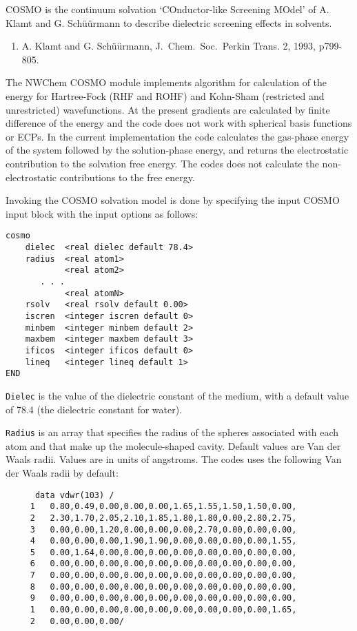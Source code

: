 \label{sec:cosmo}

COSMO is the continuum solvation `COnductor-like Screening MOdel'
of A. Klamt and G. Sch\"{u}\"{u}rmann to describe dielectric screening
effects in solvents.

\begin{enumerate}
\item A. Klamt and G. Sch\"{u}\"{u}rmann, J.~Chem.~Soc.~Perkin Trans. 2, 1993,
p799-805.
\end{enumerate}

The NWChem COSMO module implements algorithm for calculation of the
energy for Hartree-Fock (RHF and ROHF) and Kohn-Sham (restricted and unrestricted)
wavefunctions. At the present gradients are calculated by finite
difference of the energy and the code does not work with spherical
basis functions or ECPs.  In the current implementation the code
calculates the gas-phase energy of the system followed by the
solution-phase energy, and returns the electrostatic contribution
to the solvation free energy. The codes does not calculate the
non-electrostatic contributions to the free energy.

Invoking the COSMO solvation model is done by specifying the input
COSMO input block with the input options as follows:

\begin{verbatim}
cosmo
    dielec  <real dielec default 78.4>
    radius  <real atom1>
            <real atom2>
       . . .
            <real atomN>
    rsolv   <real rsolv default 0.00>
    iscren  <integer iscren default 0>
    minbem  <integer minbem default 2>
    maxbem  <integer maxbem default 3>
    ificos  <integer ificos default 0>
    lineq   <integer lineq default 1>
END
\end{verbatim}

\verb+Dielec+ is the value of the dielectric constant of the medium, 
with a default value of 78.4 (the dielectric constant for water).

\verb+Radius+ is an array that specifies the radius of the spheres
associated with each atom and that make up the molecule-shaped cavity.
Default values are Van der Waals radii. Values are in units of angstroms.
The codes uses the following Van der Waals radii by default:

\begin{verbatim}
      data vdwr(103) /
     1   0.80,0.49,0.00,0.00,0.00,1.65,1.55,1.50,1.50,0.00,
     2   2.30,1.70,2.05,2.10,1.85,1.80,1.80,0.00,2.80,2.75,
     3   0.00,0.00,1.20,0.00,0.00,0.00,2.70,0.00,0.00,0.00,
     4   0.00,0.00,0.00,1.90,1.90,0.00,0.00,0.00,0.00,1.55,
     5   0.00,1.64,0.00,0.00,0.00,0.00,0.00,0.00,0.00,0.00,
     6   0.00,0.00,0.00,0.00,0.00,0.00,0.00,0.00,0.00,0.00,
     7   0.00,0.00,0.00,0.00,0.00,0.00,0.00,0.00,0.00,0.00,
     8   0.00,0.00,0.00,0.00,0.00,0.00,0.00,0.00,0.00,0.00,
     9   0.00,0.00,0.00,0.00,0.00,0.00,0.00,0.00,0.00,0.00,
     1   0.00,0.00,0.00,0.00,0.00,0.00,0.00,0.00,0.00,1.65,
     2   0.00,0.00,0.00/
\end{verbatim}

